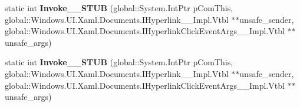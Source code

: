 \begin{DoxyCompactItemize}
static int {\bfseries Invoke\+\_\+\+\_\+\+S\+T\+UB} (global\+::\+System.\+Int\+Ptr p\+Com\+This, global\+::\+Windows.\+U\+I.\+Xaml.\+Documents.\+I\+Hyperlink\+\_\+\+\_\+\+Impl.\+Vtbl $\ast$$\ast$unsafe\+\_\+sender, global\+::\+Windows.\+U\+I.\+Xaml.\+Documents.\+I\+Hyperlink\+Click\+Event\+Args\+\_\+\+\_\+\+Impl.\+Vtbl $\ast$$\ast$unsafe\+\_\+args)
\item 
\mbox{\label{struct_windows_1_1_foundation_1_1_typed_event_handler___a___windows___u_i___xaml___documents___hfd9a29b8a1965140a2921dbd50b4ecfb_a58c50eaf000838116445cd3c7cc1f441}} 
static int {\bfseries Invoke\+\_\+\+\_\+\+S\+T\+UB} (global\+::\+System.\+Int\+Ptr p\+Com\+This, global\+::\+Windows.\+U\+I.\+Xaml.\+Documents.\+I\+Hyperlink\+\_\+\+\_\+\+Impl.\+Vtbl $\ast$$\ast$unsafe\+\_\+sender, global\+::\+Windows.\+U\+I.\+Xaml.\+Documents.\+I\+Hyperlink\+Click\+Event\+Args\+\_\+\+\_\+\+Impl.\+Vtbl $\ast$$\ast$unsafe\+\_\+args)
\end{DoxyCompactItemize}
